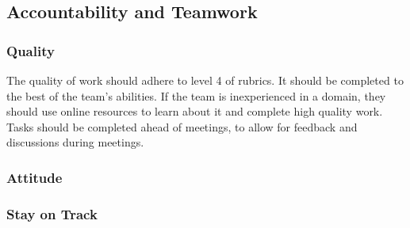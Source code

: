 \documentclass{article}
\begin{document}
\subsection*{Accountability and Teamwork}

\subsubsection*{Quality} 

\begin{comment}
\wss{What are your team's expectations regarding the quality
of team members' preparation for team meetings and the quality of the
deliverables that members bring to the team?}
\end{comment}

The quality of work should adhere to level 4 of rubrics. It should be completed to the best of the team's abilities. If the team is inexperienced in a domain, they should use online resources to learn about it and complete high quality work. Tasks should be completed ahead of meetings, to allow for feedback and discussions during meetings.
\subsubsection*{Attitude}

\begin{comment}
\wss{What are your team's expectations regarding team members' ideas,
interactions with the team, cooperation, attitudes, and anything else regarding
team member contributions?  Do you want to introduce a code of conduct?  Do you
want a conflict resolution plan?  Can adopt existing codes of conduct.}
\end{comment}

\subsubsection*{Stay on Track}

\begin{comment}
\wss{What methods will be used to keep the team on track? How will your team
ensure that members contribute as expected to the team and that the team
performs as expected? How will your team reward members who do well and manage
members whose performance is below expectations?  What are the consequences for
someone not contributing their fair share?}
\end{comment}


\begin{comment}
\wss{You may wish to use the project management metrics collected for the TA and
instructor for this.}
\end{comment}
\end{document}
